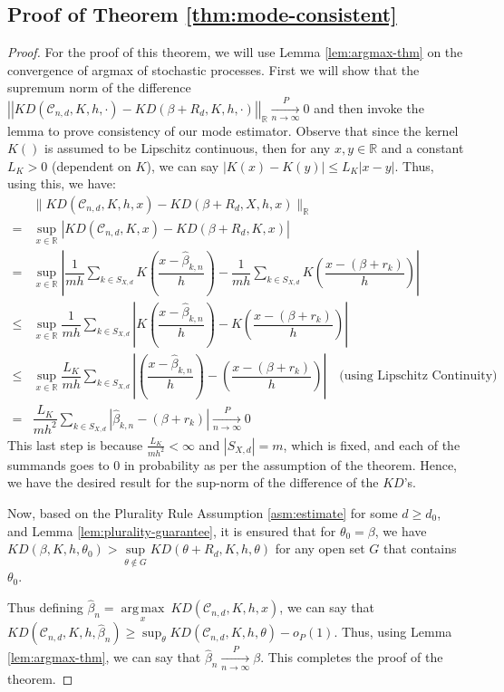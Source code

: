 \documentclass[
  12pt]{article}
\DeclareMathOperator*{\argmax}{arg\,max}
\newcommand{\pnlim}{\xrightarrow[n \to \infty]{P}}
\newcommand{\calC}{\mathcal{C}}
\newcommand{\R}{\mathbb{R}}
\newcommand{\smallo}{o}
\begin{document}
\subsection{Proof of Theorem \ref{thm:mode-consistent}}
\begin{proof}
        For the proof of this theorem, we will use Lemma \ref{lem:argmax-thm} on the convergence of argmax of stochastic processes. First we will show that the supremum norm of the difference $\left|\left|KD(\calC_{n,d},K,h,\cdot) - KD(\beta+R_d,K,h,\cdot)\right|\right|_\R\pnlim 0$ and then invoke the lemma to prove consistency of our mode estimator. Observe that since the kernel $K()$ is assumed to be Lipschitz continuous, then for any $x,y \in \R$ and a constant $L_K > 0$ (dependent on $K$), we can say $|K(x) - K(y)| \leq L_K |x-y|$. Thus, using this, we have:
    $$
    \begin{aligned}
        & \|KD(\calC_{n,d},K,h,x) - KD(\beta+R_d,X,h,x)\|_\R\\ 
        = & \underset{x \in \R}{\sup}\left|KD(\calC_{n,d},K,x) - KD(\beta+R_d,K,x)\right|\\
        = & \underset{x \in \R}{\sup}\left|\dfrac{1}{mh}\sum_{k \in S_{X,d}}K\left(\dfrac{x - \hat{\beta}_{k,n}}{h}\right) - \dfrac{1}{mh}\sum_{k \in S_{X,d}}K\left(\dfrac{x - (\beta + r_k)}{h}\right)\right|\\
        \leq & \underset{x \in \R}{\sup}\dfrac{1}{mh}\sum_{k \in S_{X,d}}\left|K\left(\dfrac{x - \hat{\beta}_{k,n}}{h}\right) - K\left(\dfrac{x - (\beta + r_k)}{h}\right)\right|\\
        \leq & \underset{x \in \R}{\sup}\dfrac{L_K}{mh}\sum_{k \in S_{X,d}}\left|\left(\dfrac{x - \hat{\beta}_{k,n}}{h}\right) - \left(\dfrac{x - (\beta + r_k)}{h}\right)\right| \quad \text{(using Lipschitz Continuity)}\\
        = & \dfrac{L_K}{mh^2}\sum_{k \in S_{X,d}}\left|\hat{\beta}_{k,n}-(\beta + r_k)\right| \pnlim 0 
    \end{aligned}
    $$
    This last step is because $\frac{L_K}{mh^2}< \infty$ and $|S_{X,d}| = m$, which is fixed, and each of the summands goes to 0 in probability as per the assumption of the theorem. Hence, we have the desired result for the sup-norm of the difference of the $KD$'s. 

    Now, based on the Plurality Rule Assumption \ref{asm:estimate} for some $d \geq d_0$, and Lemma \ref{lem:plurality-guarantee},   
    it is ensured that for $\theta_0 = \beta$, we have $KD(\beta,K,h,\theta_0) > \underset{\theta \notin G}{\sup} KD(\theta+R_d,K,h,\theta)$ for any open set $G$ that contains $\theta_0$. 
    
    Thus defining $\hat{\beta}_n = \underset{x}{\argmax} 
    \ KD(\calC_{n,d},K,h,x)$, we can say that $KD\left(\calC_{n,d},K,h,\hat{\beta}_n\right) \geq \sup_\theta KD\left(\calC_{n,d},K,h,\theta\right) - \smallo_P(1)$. Thus, using Lemma \ref{lem:argmax-thm}, we can say that $\hat{\beta}_n \pnlim \beta$. This completes the proof of the theorem.
\end{proof}
\end{document}
